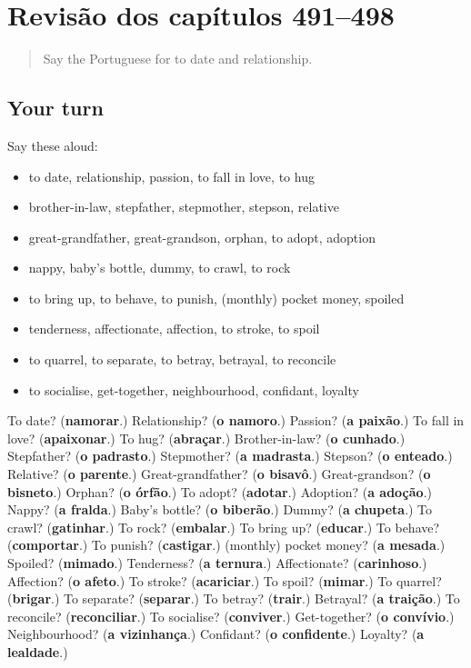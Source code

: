 \section[(dialogue)]{Revisão dos capítulos 491–498}

\label{lesson:PT-R498-revisao-491-498}



\begin{quote}
Say the Portuguese for to date and relationship.
\end{quote}

\subsection*{Your turn}
Say these aloud:

\begin{itemize}
\raggedright
  \item to date, relationship, passion, to fall in love, to hug
  \item brother-in-law, stepfather, stepmother, stepson, relative
  \item great-grandfather, great-grandson, orphan, to adopt, adoption
  \item nappy, baby's bottle, dummy, to crawl, to rock
  \item to bring up, to behave, to punish, (monthly) pocket money, spoiled
  \item tenderness, affectionate, affection, to stroke, to spoil
  \item to quarrel, to separate, to betray, betrayal, to reconcile
  \item to socialise, get-together, neighbourhood, confidant, loyalty
\end{itemize}

\begin{tcolorbox}[breakable,colback=teal!4,colframe=teal!35!black,title={Before you move on}]
To date? (\textbf{namorar}.) Relationship? (\textbf{o namoro}.) Passion? (\textbf{a paixão}.) To fall in love? (\textbf{apaixonar}.) To hug? (\textbf{abraçar}.) Brother-in-law? (\textbf{o cunhado}.) Stepfather? (\textbf{o padrasto}.) Stepmother? (\textbf{a madrasta}.) Stepson? (\textbf{o enteado}.) Relative? (\textbf{o parente}.) Great-grandfather? (\textbf{o bisavô}.) Great-grandson? (\textbf{o bisneto}.) Orphan? (\textbf{o órfão}.) To adopt? (\textbf{adotar}.) Adoption? (\textbf{a adoção}.) Nappy? (\textbf{a fralda}.) Baby's bottle? (\textbf{o biberão}.) Dummy? (\textbf{a chupeta}.) To crawl? (\textbf{gatinhar}.) To rock? (\textbf{embalar}.) To bring up? (\textbf{educar}.) To behave? (\textbf{comportar}.) To punish? (\textbf{castigar}.) (monthly) pocket money? (\textbf{a mesada}.) Spoiled? (\textbf{mimado}.) Tenderness? (\textbf{a ternura}.) Affectionate? (\textbf{carinhoso}.) Affection? (\textbf{o afeto}.) To stroke? (\textbf{acariciar}.) To spoil? (\textbf{mimar}.) To quarrel? (\textbf{brigar}.) To separate? (\textbf{separar}.) To betray? (\textbf{trair}.) Betrayal? (\textbf{a traição}.) To reconcile? (\textbf{reconciliar}.) To socialise? (\textbf{conviver}.) Get-together? (\textbf{o convívio}.) Neighbourhood? (\textbf{a vizinhança}.) Confidant? (\textbf{o confidente}.) Loyalty? (\textbf{a lealdade}.)
\end{tcolorbox}
